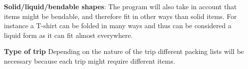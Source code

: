 \textbf{Solid/liquid/bendable shapes}:
The program will also take in account that items might be bendable, and therefore fit in other ways than solid items. For instance a T-shirt can be folded in many ways and thus can be considered a liquid form as it can fit almost everywhere.
\newline

\textbf{Type of trip}
Depending on the nature of the trip different packing lists will be necessary because each trip might require different items.
\newline
